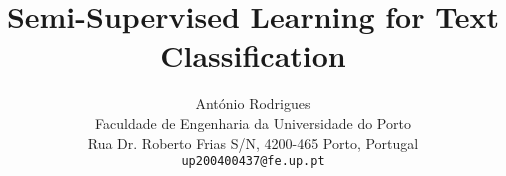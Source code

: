 \documentclass[10pt,twocolumn,letterpaper]{article}
\begin{document}
\title{Semi-Supervised Learning for Text Classification}

\author{António Rodrigues\\
Faculdade de Engenharia da Universidade do Porto\\
Rua Dr. Roberto Frias S\slash N, 4200-465 Porto, Portugal\\
{\tt\small up200400437@fe.up.pt}
}

\maketitle



















{\small


}

\newpage
\rule{0pt}{1pt}\newpage
\rule{0pt}{1pt}\newpage
\rule{0pt}{1pt}\newpage
\rule{0pt}{1pt}\newpage
\rule{0pt}{1pt}\newpage
\rule{0pt}{1pt}\newpage
\rule{0pt}{1pt}\newpage
\rule{0pt}{1pt}\newpage
\end{document}
